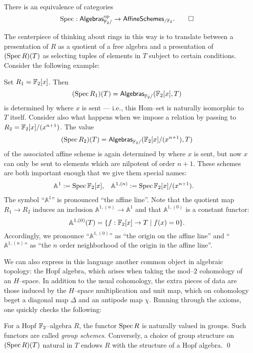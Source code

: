 \begin{lemma}
There is an equivalence of categories \[\operatorname{Spec}: \mathsf{Algebras}_{\mathbb F_2/}^{\mathrm{op}} \to \mathsf{AffineSchemes}_{/\mathbb F_2}. \qed\]
\end{lemma}

The centerpiece of thinking about rings in this way is to translate between a presentation of $R$ as a quotient of a free algebra and a presentation of $(\operatorname{Spec} R)(T)$ as selecting tuples of elements in $T$ subject to certain conditions.  Consider the following example:
\begin{example}
Set $R_1 = \mathbb F_2[x]$.  Then \[(\operatorname{Spec} R_1)(T) = \mathsf{Algebras}_{\mathbb F_2/}(\mathbb F_2[x], T)\] is determined by where $x$ is sent --- i.e., this Hom--set is naturally isomorphic to $T$ itself.  Consider also what happens when we impose a relation by passing to $R_2 = \mathbb F_2[x] / (x^{n+1})$.  The value \[(\operatorname{Spec} R_2)(T) = \mathsf{Algebras}_{\mathbb F_2/}(\mathbb F_2[x] / (x^{n+1}), T)\] of the associated affine scheme is again determined by where $x$ is sent, but now $x$ can only be sent to elements which are nilpotent of order $n+1$.  These schemes are both important enough that we give them special names:
\begin{align*}
\mathbb A^1 & := \operatorname{Spec} \mathbb F_2[x], & \mathbb A^{1, (n)} & := \operatorname{Spec} \mathbb F_2[x] / (x^{n+1}).
\end{align*}
The symbol ``$\mathbb A^1$'' is pronounced ``the affine line''.  Note that the quotient map $R_1 \to R_2$ induces an inclusion $\mathbb A^{1, (n)} \to \mathbb A^1$ and that $\mathbb A^{1, (0)}$ is a constant functor: \[\mathbb A^{1, (0)}(T) = \{f: \mathbb F_2[x] \to T \mid f(x) = 0\}.\]  Accordingly, we pronounce ``$\mathbb A^{1, (0)}$'' as ``the origin on the affine line'' and ``$\mathbb A^{1, (n)}$'' as ``the $n${\th} order neighborhood of the origin in the affine line''.
\end{example}

We can also express in this language another common object in algebraic topology: the Hopf algebra, which arises when taking the mod--$2$ cohomology of an $H$--space.  In addition to the usual cohomology, the extra pieces of data are those induced by the $H$--space multiplication and unit map, which on cohomology beget a diagonal map $\Delta$ and an antipode map $\chi$.  Running through the axioms, one quickly checks the following:
\begin{lemma}
For a Hopf $\mathbb F_2$--algebra $R$, the functor $\operatorname{Spec} R$ is naturally valued in groups.  Such functors are called \textit{group schemes}.  Conversely, a choice of group structure on $(\operatorname{Spec} R)(T)$ natural in $T$ endows $R$ with the structure of a Hopf algebra.  \qed
\end{lemma}

